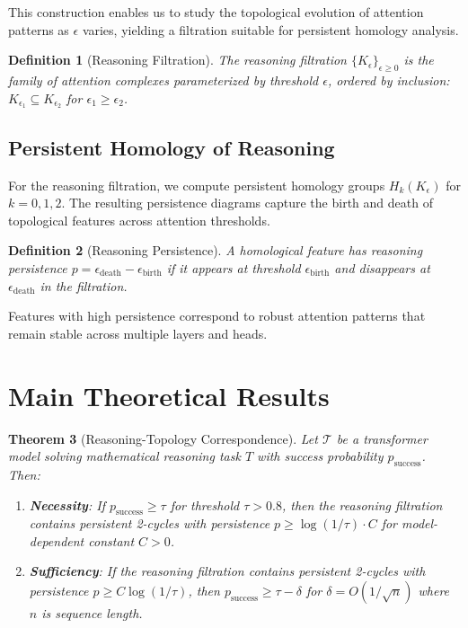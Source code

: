 \documentclass[11pt,a4paper]{article}
\newtheorem{theorem}{Theorem}[section]
\newtheorem{definition}[theorem]{Definition}
\begin{document}
This construction enables us to study the topological evolution of attention patterns as $\epsilon$ varies, yielding a filtration suitable for persistent homology analysis.

\begin{definition}[Reasoning Filtration]
The \textit{reasoning filtration} $\{K_\epsilon\}_{\epsilon \geq 0}$ is the family of attention complexes parameterized by threshold $\epsilon$, ordered by inclusion: $K_{\epsilon_1} \subseteq K_{\epsilon_2}$ for $\epsilon_1 \geq \epsilon_2$.
\end{definition}

\subsection{Persistent Homology of Reasoning}

For the reasoning filtration, we compute persistent homology groups $H_k(K_\epsilon)$ for $k = 0, 1, 2$. The resulting persistence diagrams capture the birth and death of topological features across attention thresholds.

\begin{definition}[Reasoning Persistence]
A homological feature has \textit{reasoning persistence} $p = \epsilon_{\text{death}} - \epsilon_{\text{birth}}$ if it appears at threshold $\epsilon_{\text{birth}}$ and disappears at $\epsilon_{\text{death}}$ in the filtration.
\end{definition}

Features with high persistence correspond to robust attention patterns that remain stable across multiple layers and heads.

\section{Main Theoretical Results}

\begin{theorem}[Reasoning-Topology Correspondence]
\label{thm:main}
Let $\mathcal{T}$ be a transformer model solving mathematical reasoning task $T$ with success probability $p_{\text{success}}$. Then:

\begin{enumerate}
\item \textbf{Necessity}: If $p_{\text{success}} \geq \tau$ for threshold $\tau > 0.8$, then the reasoning filtration contains persistent 2-cycles with persistence $p \geq \log(1/\tau) \cdot C$ for model-dependent constant $C > 0$.

\item \textbf{Sufficiency}: If the reasoning filtration contains persistent 2-cycles with persistence $p \geq C \log(1/\tau)$, then $p_{\text{success}} \geq \tau - \delta$ for $\delta = O(1/\sqrt{n})$ where $n$ is sequence length.
\end{enumerate}
\end{theorem}
\end{document}
